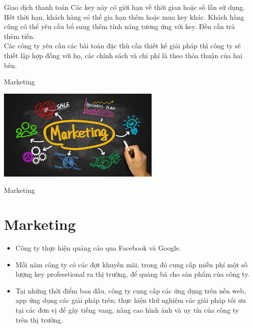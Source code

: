 \documentclass{beamer}
\begin{document}
\begin{frame}{Giao dịch thanh toán}
Các key này có giới hạn về thời gian hoặc số lần sử dụng. Hết thời hạn, khách hàng có thể gia hạn thêm hoặc mua key khác. Khách hàng cũng có thể yêu cầu bổ sung thêm tính năng tương ứng với key. Đều cần trả thêm tiền.\\

Các công ty yêu cầu các bài toán đặc thù cần thiết kế giải pháp thì công ty sẽ thiết lập hợp đồng với họ, các chính sách và chi phí là theo thỏa thuận của hai bên.

\end{frame}
\begin{frame}{Marketing}
\begin{center}
\includegraphics[scale=0.7]{marketing.jpg}\\
\end{center}
\end{frame}
\begin{frame}{Marketing}
\section{Marketing}

\begin{itemize}
\item Công ty thực hiện quảng cáo qua Facebook và Google.

\item Mỗi năm công ty có các đợt khuyến mãi, trong đó cung cấp miễn phí một số lượng key professtional ra thị trường, để quảng bá cho sản phẩm của công ty.

\item Tại những thời điểm ban đầu, công ty cung cấp các ứng dụng trên nền web, app ứng dụng các giải pháp trên; thực hiện thử nghiệm các giải pháp tối ưu tại các đơn vị để gây tiếng vang, nâng cao hình ảnh và uy tín của công ty trên thị trường.


\end{itemize}

\end{frame}
\end{document}
